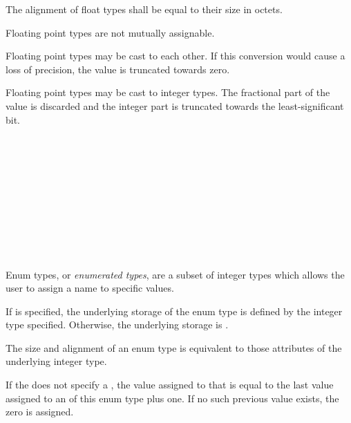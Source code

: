 \specsubsubitem
The alignment of float types shall be equal to their size in octets.

\specsubsubitem
Floating point types are not mutually assignable.

\specsubsubitem
Floating point types may be cast to each other. If this conversion would cause a
loss of precision, the value is truncated towards zero.

\specsubsubitem
Floating point types may be cast to integer types. The fractional part of the
value is discarded and the integer part is truncated towards the
least-significant bit.


\begin{grammar}
 \\
	 \terminal{\{}  \terminal{\}} \\
	  \terminal{\{}  \terminal{\}} \\

 \\
	 \optional{\terminal{,}} \\
	 \terminal{,}  \\

 \\
	 \\
	 \terminal{=}  \\
\end{grammar}

\specsubsubitem
Enum types, or \textit{enumerated types}, are a subset of integer types which
allows the user to assign a name to specific values.

\specsubsubitem
If  is specified, the underlying storage of the enum
type is defined by the integer type specified. Otherwise, the underlying storage
is .

\specsubsubitem
The size and alignment of an enum type is equivalent to those attributes of the
underlying integer type.

\specsubsubitem
If the  does not specify a
, the value assigned to that 
is equal to the last value assigned to an  of this enum
type plus one. If no such previous value exists, the zero is assigned.

